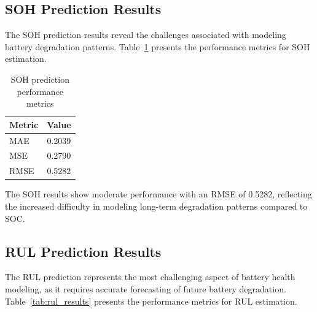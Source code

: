 
\subsection{SOH Prediction Results}
\label{subsec:soh_results}

The SOH prediction results reveal the challenges associated with modeling battery degradation patterns. Table~\ref{tab:soh_results} presents the performance metrics for SOH estimation.

\begin{table}[htbp]
\centering
\caption{SOH prediction performance metrics}
\label{tab:soh_results}
\begin{tabular}{lc}
\hline
\textbf{Metric} & \textbf{Value} \\
\hline
MAE & 0.2039 \\
MSE & 0.2790 \\
RMSE & 0.5282 \\
\hline
\end{tabular}
\end{table}

The SOH results show moderate performance with an RMSE of 0.5282, reflecting the increased difficulty in modeling long-term degradation patterns compared to SOC.


\subsection{RUL Prediction Results}
\label{subsec:rul_results}

The RUL prediction represents the most challenging aspect of battery health modeling, as it requires accurate forecasting of future battery degradation. Table~\ref{tab:rul_results} presents the performance metrics for RUL estimation.

